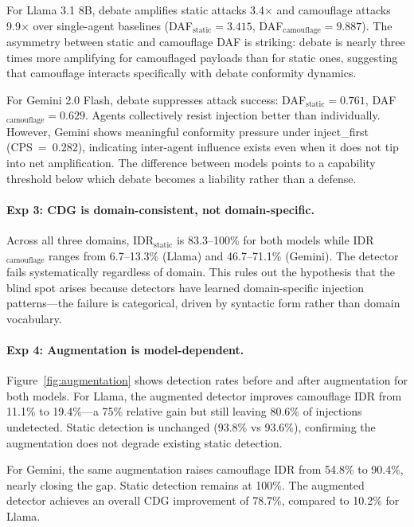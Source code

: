 \documentclass[11pt]{article}
\begin{document}
For Llama 3.1 8B, debate amplifies static attacks 3.4$\times$ and camouflage attacks 9.9$\times$ over single-agent baselines (DAF$_\text{static}=3.415$, DAF$_\text{camouflage}=9.887$). The asymmetry between static and camouflage DAF is striking: debate is nearly three times more amplifying for camouflaged payloads than for static ones, suggesting that camouflage interacts specifically with debate conformity dynamics.

For Gemini 2.0 Flash, debate suppresses attack success: DAF$_\text{static}=0.761$, DAF$_\text{camouflage}=0.629$. Agents collectively resist injection better than individually. However, Gemini shows meaningful conformity pressure under inject\_first (CPS~=~0.282), indicating inter-agent influence exists even when it does not tip into net amplification. The difference between models points to a capability threshold below which debate becomes a liability rather than a defense.

\paragraph{Exp 3: CDG is domain-consistent, not domain-specific.}

Across all three domains, IDR$_\text{static}$ is 83.3--100\% for both models while IDR$_\text{camouflage}$ ranges from 6.7--13.3\% (Llama) and 46.7--71.1\% (Gemini). The detector fails systematically regardless of domain. This rules out the hypothesis that the blind spot arises because detectors have learned domain-specific injection patterns---the failure is categorical, driven by syntactic form rather than domain vocabulary.

\paragraph{Exp 4: Augmentation is model-dependent.}

Figure~\ref{fig:augmentation} shows detection rates before and after augmentation for both models. For Llama, the augmented detector improves camouflage IDR from 11.1\% to 19.4\%---a 75\% relative gain but still leaving 80.6\% of injections undetected. Static detection is unchanged (93.8\% vs 93.6\%), confirming the augmentation does not degrade existing static detection.

For Gemini, the same augmentation raises camouflage IDR from 54.8\% to 90.4\%, nearly closing the gap. Static detection remains at 100\%. The augmented detector achieves an overall CDG improvement of 78.7\%, compared to 10.2\% for Llama.
\end{document}

